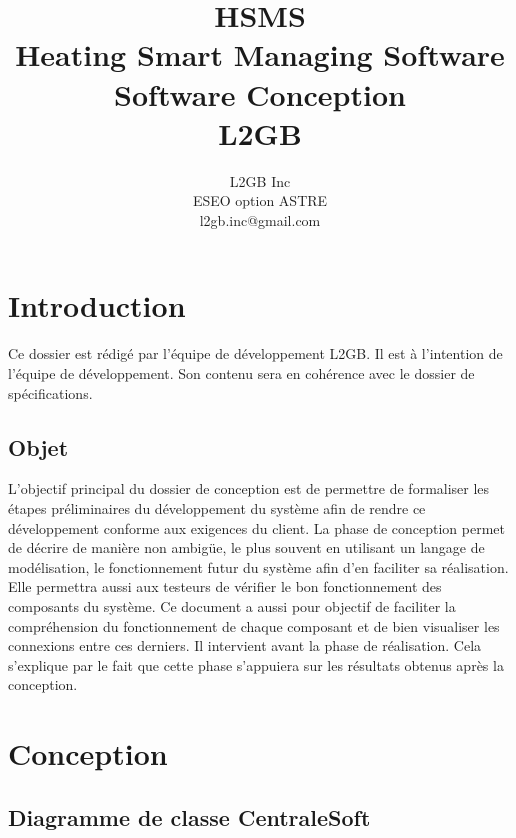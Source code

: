 \documentclass[11pt,a4paper]{report} %
\author{L2GB Inc\\
		ESEO option ASTRE\\
		l2gb.inc@gmail.com
		}
\title{HSMS\\Heating Smart Managing Software  \\Software Conception\\L2GB}
\newcommand{\sommaire}{\shorttoc{Sommaire}{1}}
\begin{document}

\maketitle %
\sommaire %

	\chapter{Introduction}
Ce dossier est rédigé par l’équipe de développement L2GB. Il est à l’intention de l’équipe de développement. Son contenu sera en cohérence avec le dossier de spécifications. 
		\section{Objet}
		
L’objectif principal du dossier de conception est de permettre de formaliser les étapes préliminaires du développement du système afin de rendre ce développement conforme aux exigences du client. La phase de conception permet de décrire de manière non ambigüe, le plus souvent en utilisant un langage de modélisation, le fonctionnement futur du système afin d’en faciliter sa réalisation. Elle permettra aussi aux testeurs de vérifier le bon fonctionnement des composants du système. Ce document a aussi pour objectif de faciliter la compréhension du fonctionnement de chaque composant et de bien visualiser les connexions entre ces derniers. Il intervient avant la phase de réalisation. Cela s'explique par le fait que cette phase s’appuiera sur les résultats obtenus après la conception.

		\chapter{Conception}
		
		\section{Diagramme de classe CentraleSoft}
		\newpage
		
\end{document}
